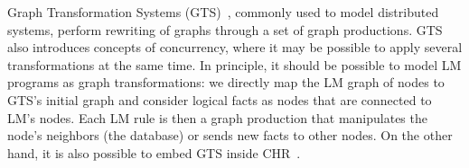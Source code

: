 Graph Transformation Systems (GTS)~\cite{Ehrig:2004vn}, commonly used to model
distributed systems, perform rewriting of graphs through a set of graph
productions. GTS also introduces concepts of concurrency, where it may be
possible to apply several transformations at the same time. In principle, it
should be possible to model LM programs as graph transformations: we directly
map the LM graph of nodes to GTS's initial graph and consider logical facts as
nodes that are connected to LM's nodes. Each LM rule is then a graph production
that manipulates the node's neighbors (the database) or sends new facts to other
nodes. On the other hand, it is also possible to embed GTS inside
CHR~\cite{Raiser:2011:AGT:1972935.1972938}.
